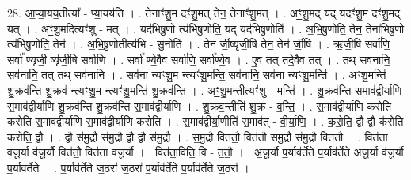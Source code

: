 \documentclass[17pt]{extarticle}
\begin{document}
28. आ॒प्या॒यय॒तीत्या᳚ - प्या॒यय॑ति । . तेनाꣳ॑शु॒म दꣳ॑शु॒मत् तेन॒ तेनाꣳ॑शु॒मत् । . अꣳ॒॒शु॒मद् यद् यदꣳ॑शु॒म दꣳ॑शु॒मद् यत् । . अꣳ॒॒शु॒मदित्यꣳ॑शु - मत् । . यद॑भिषु॒णो त्य॑भिषु॒णोति॒ यद् यद॑भिषु॒णोति॑ । . अ॒भि॒षु॒णोति॒ तेन॒ तेना॑भिषु॒णो त्य॑भिषु॒णोति॒ तेन॑ । . अ॒भि॒षु॒णोतीत्य॑भि - सु॒नोति॑ । . तेन॑ र्जी॒ष्यृ॑जी॒षि तेन॒ तेन॑ र्जी॒षि । . ऋ॒जी॒षि सर्वा॑णि॒ सर्वा᳚ ण्यृजी॒ ष्यृ॑जी॒षि सर्वा॑णि । . सर्वा᳚ ण्ये॒वैव सर्वा॑णि॒ सर्वा᳚ण्ये॒व । . ए॒व तत् तदे॒वैव तत् । . तथ् सव॑नानि॒ सव॑नानि॒ तत् तथ् सव॑नानि । . सव॑ना न्यꣳशु॒म न्त्यꣳ॑शु॒मन्ति॒ सव॑नानि॒ सव॑ना न्यꣳशु॒मन्ति॑ । . अꣳ॒॒शु॒मन्ति॑ शु॒क्रव॑न्ति शु॒क्रव॑ न्त्यꣳशु॒म न्त्यꣳ॑शु॒मन्ति॑ शु॒क्रव॑न्ति । . अꣳ॒॒शु॒मन्तीत्यꣳ॑शु - मन्ति॑ । . शु॒क्रव॑न्ति स॒माव॑द्वीर्याणि स॒माव॑द्वीर्याणि शु॒क्रव॑न्ति शु॒क्रव॑न्ति स॒माव॑द्वीर्याणि । . शु॒क्रव॒न्तीति॑ शु॒क्र - व॒न्ति॒ । . स॒माव॑द्वीर्याणि करोति करोति स॒माव॑द्वीर्याणि स॒माव॑द्वीर्याणि करोति । . स॒माव॑द्वीर्या॒णीति॑ स॒माव॑त् - वी॒र्या॒णि॒ । . क॒रो॒ति॒ द्वौ द्वौ क॑रोति करोति॒ द्वौ । . द्वौ स॑मु॒द्रौ स॑मु॒द्रौ द्वौ द्वौ स॑मु॒द्रौ । . स॒मु॒द्रौ वित॑तौ॒ वित॑तौ समु॒द्रौ स॑मु॒द्रौ वित॑तौ । . वित॑ता वजू॒र्या व॑जू॒र्यौ वित॑तौ॒ वित॑ता वजू॒र्यौ । . वित॑ता॒विति॒ वि - त॒तौ॒ । . अ॒जू॒र्यौ प॒र्याव॑र्तेते प॒र्याव॑र्तेते अजू॒र्या व॑जू॒र्यौ प॒र्याव॑र्तेते । . प॒र्याव॑र्तेते ज॒ठरा॑ ज॒ठरा॑ प॒र्याव॑र्तेते प॒र्याव॑र्तेते ज॒ठरा᳚ । \newline
\end{document}
